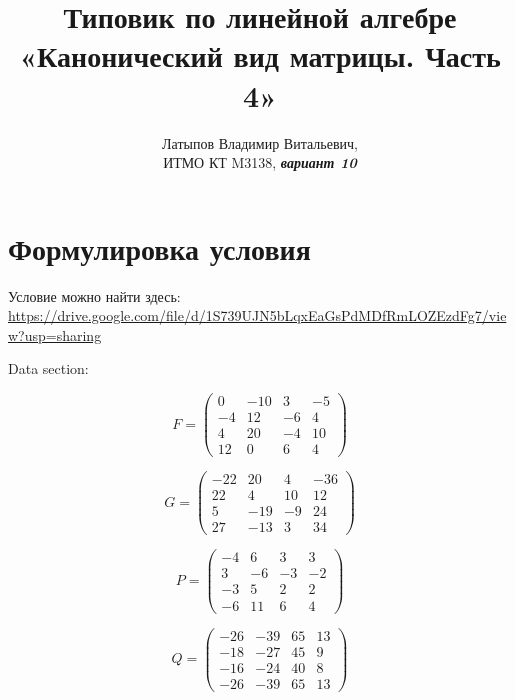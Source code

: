 \documentclass[12pt, a4paper]{article}
\author{Латыпов Владимир Витальевич, \\ ИТМО КТ M3138, \Huge{\textit{\textbf{вариант 10}}}}
\title{Типовик по линейной алгебре «Канонический вид матрицы. Часть 4»}
\begin{document}
    \tit

    \section{Формулировка условия}

    \begin{statement}
        Условие можно найти здесь: \url{https://drive.google.com/file/d/1S739UJN5bLqxEaGsPdMDfRmLOZEzdFg7/view?usp=sharing}

        Data section:

        \begin{equation}
            F = \left(\begin{matrix}
                0 & -10 & 3 & -5 \\
                -4 & 12 & -6 & 4 \\
                4 & 20 & -4 & 10 \\
                12 & 0 & 6 & 4
            \end{matrix}\right)
        \end{equation}

        \begin{equation}
            G = \left(\begin{matrix}
                -22 & 20 & 4 & -36 \\
                22 & 4 & 10 & 12 \\
                5 & -19 & -9 & 24 \\
                27 & -13 & 3 & 34
            \end{matrix}\right)
        \end{equation}

        \begin{equation}
            P = \left(\begin{matrix}
                -4 & 6 & 3 & 3 \\
                3 & -6 & -3 & -2 \\
                -3 & 5 & 2 & 2 \\
                -6 & 11 & 6 & 4
            \end{matrix}\right)
        \end{equation}

        \begin{equation}
            Q = \left(\begin{matrix}
                -26 & -39 & 65 & 13 \\
                -18 & -27 & 45 & 9 \\
                -16 & -24 & 40 & 8 \\
                -26 & -39 & 65 & 13
            \end{matrix}\right)
        \end{equation}


\end{statement}
\end{document}
